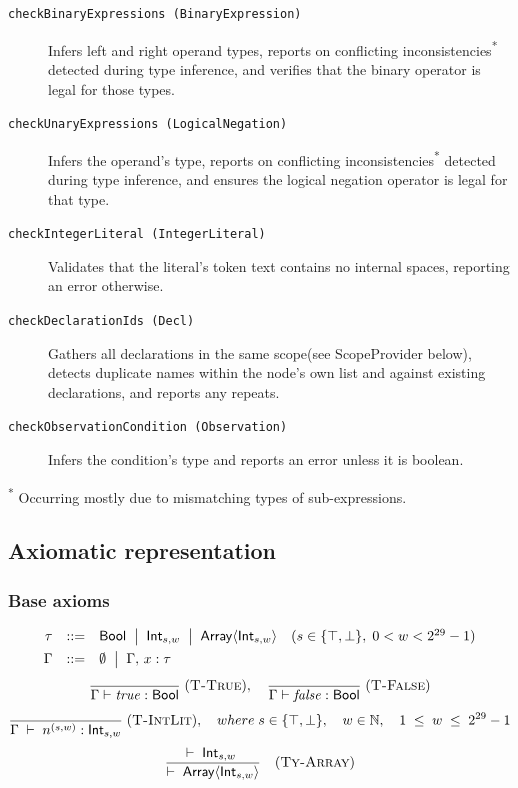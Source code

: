 \begin{description}
  \item[\texttt{checkBinaryExpressions (BinaryExpression)}]
    Infers left and right operand types, reports on conflicting inconsistencies\textsuperscript{*} detected during type inference, and verifies that the binary operator is legal for those types.

  \item[\texttt{checkUnaryExpressions (LogicalNegation)}]
    Infers the operand's type, reports on conflicting inconsistencies\textsuperscript{*} detected during type inference, and ensures the logical negation operator is legal for that type.

  \item[\texttt{checkIntegerLiteral (IntegerLiteral)}]
    Validates that the literal's token text contains no internal spaces, reporting an error otherwise.

  \item[\texttt{checkDeclarationIds (Decl)}]
    Gathers all declarations in the same scope(see ScopeProvider below), detects duplicate names within the node's own list and against existing declarations, and reports any repeats.

  \item[\texttt{checkObservationCondition (Observation)}]
    Infers the condition's type and reports an error unless it is boolean.

\end{description}
\textsuperscript{*} Occurring mostly due to mismatching types of sub-expressions.

\subsection{Axiomatic representation}

\subsubsection*{Base axioms}
\[
  \begin{array}{rcll}
    \tau   & ::=                                & \mathsf{Bool}
    \;\bigm|\; \mathsf{Int}_{s,w}
    \;\bigm|\; \mathsf{Array}\langle\mathsf{Int}_{s,w}\rangle
           & (s\in\{\top,\bot\},\;0<w<2^{29}-1)                 \\[1ex]
    \Gamma & ::=                                & \emptyset
    \;\bigm|\; \Gamma,\,x:\tau
  \end{array}
\]
\[
  \frac{}{\Gamma \vdash \mathit{true} : \mathsf{Bool}}
  \; (\textsc{T-True}), \quad
  \frac{}{\Gamma \vdash \mathit{false} : \mathsf{Bool}}
  \; (\textsc{T-False})
\]
\[
  \frac{}
  {\Gamma \;\vdash\; n^{(s,w)} : \mathsf{Int}_{s,w}}
  \; (\textsc{T-IntLit}), \quad
  where\;
  s \in \{\top, \bot\},
  \quad
  w \in \mathbb{N},
  \quad
  1 \;\le\; w \;\le\; 2^{29}-1
\]
\[
  \frac{\vdash\;\mathsf{Int}_{s,w}\;}
  {\vdash\;\mathsf{Array}\langle\mathsf{Int}_{s,w}\rangle}
  \quad(\textsc{Ty-Array})
\]

